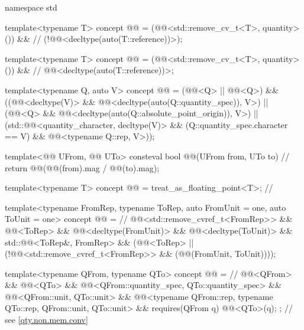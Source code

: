 \begin{codeblock}
namespace std {

template<typename T>
concept @@ =
  (@@<std::remove_cv_t<T>, quantity>()) &&     // \expos
  (!@@<decltype(auto(T::reference))>);

template<typename T>
concept @@ =
  (@@<std::remove_cv_t<T>, quantity>()) &&     // \expos
  @@<decltype(auto(T::reference))>;

template<typename Q, auto V>
concept @@ =
  (@@<Q> || @@<Q>) &&
  ((@@<decltype(V)> && @@<decltype(auto(Q::quantity_spec)), V>) ||
   (@@<Q> &&
    @@<decltype(auto(Q::absolute_point_origin)), V>) ||
   (std::@@<quantity_character, decltype(V)> && (Q::quantity_spec.character == V) &&
    @@<typename Q::rep, V>));

template<@@ UFrom, @@ UTo>
consteval bool @@(UFrom from, UTo to)              // \expos
{
  return @@(@@(from).mag / @@(to).mag);
}

template<typename T>
concept @@ = treat_as_floating_point<T>;                      // \expos

template<typename FromRep, typename ToRep, auto FromUnit = one, auto ToUnit = one>
concept @@ =                                                // \expos
  @@<std::remove_cvref_t<FromRep>> && @@<ToRep> &&
  @@<decltype(FromUnit)> && @@<decltype(ToUnit)> && std::@@<ToRep&, FromRep> &&
  (@@<ToRep> || (!@@<std::remove_cvref_t<FromRep>> &&
                              (@@(FromUnit, ToUnit))));

template<typename QFrom, typename QTo>
concept @@ =                                            // \expos
  @@<QFrom> && @@<QTo> &&
  @@<QFrom::quantity_spec, QTo::quantity_spec> &&
  @@<QFrom::unit, QTo::unit> &&
  @@<typename QFrom::rep, typename QTo::rep, QFrom::unit, QTo::unit> &&
  requires(QFrom q) { @@<QTo>(q); };                                // see \ref{qty.non.mem.conv}

}
\end{codeblock}
